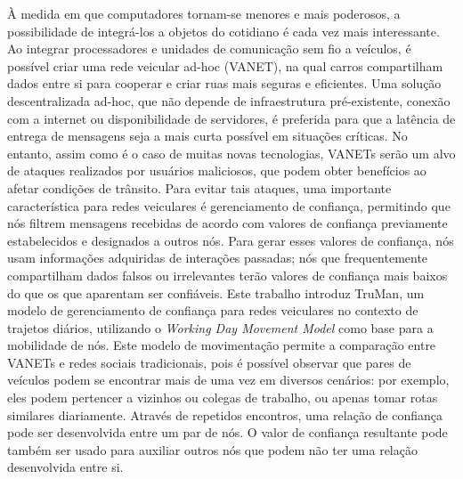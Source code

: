 \begin{resumo}



À medida em que computadores tornam-se menores e mais poderosos, a possibilidade de integrá-los a objetos do cotidiano é cada vez mais interessante.
Ao integrar processadores e unidades de comunicação sem fio a veículos, é possível criar uma rede veicular ad-hoc (VANET), na qual carros compartilham dados entre si para cooperar e criar ruas mais seguras e eficientes.
Uma solução descentralizada ad-hoc, que não depende de infraestrutura pré-existente, conexão com a internet ou disponibilidade de servidores, é preferida para que a latência de entrega de mensagens seja a mais curta possível em situações críticas.
No entanto, assim como é o caso de muitas novas tecnologias, VANETs serão um alvo de ataques realizados por usuários maliciosos, que podem obter benefícios ao afetar condições de trânsito.
Para evitar tais ataques, uma importante característica para redes veiculares é gerenciamento de confiança, permitindo que nós filtrem mensagens recebidas de acordo com valores de confiança previamente estabelecidos e designados a outros nós.
Para gerar esses valores de confiança, nós usam informações adquiridas de interações passadas; nós que frequentemente compartilham dados falsos ou irrelevantes terão valores de confiança mais baixos do que os que aparentam ser confiáveis.
Este trabalho introduz TruMan, um modelo de gerenciamento de confiança para redes veiculares no contexto de trajetos diários, utilizando o \textit{Working Day Movement Model} como base para a mobilidade de nós.
Este modelo de movimentação permite a comparação entre VANETs e redes sociais tradicionais, pois é possível observar que pares de veículos podem se encontrar mais de uma vez em diversos cenários: por exemplo, eles podem pertencer a vizinhos ou colegas de trabalho, ou apenas tomar rotas similares diariamente.
Através de repetidos encontros, uma relação de confiança pode ser desenvolvida entre um par de nós.
O valor de confiança resultante pode também ser usado para auxiliar outros nós que podem não ter uma relação desenvolvida entre si.

\end{resumo}
